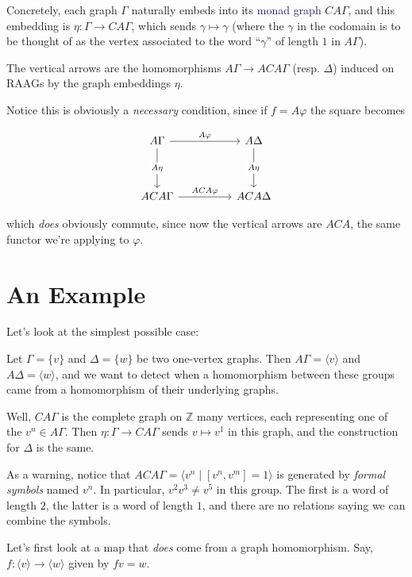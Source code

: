 \documentclass[12pt]{article}
\theoremstyle{definition}
\theoremstyle{theorem}
\newcommand*{\important}[1]{\textcolor{MidnightBlue}{#1}}
\begin{document}
Concretely, each graph $\Gamma$ naturally embeds into its 
\important{monad graph} $CA\Gamma$, and this embedding is 
$\eta : \Gamma \to CA\Gamma$, which sends $\gamma \mapsto \gamma$ 
(where the $\gamma$ in the codomain is to be thought of as the vertex 
associated to the word ``$\gamma$'' of length $1$ in $A\Gamma$).

The vertical arrows are the homomorphisms $A\Gamma \to ACA\Gamma$ (resp. $\Delta$) 
induced on RAAGs by the graph embeddings $\eta$.

Notice this is obviously a \emph{necessary} condition, since if $f = A\varphi$
the square becomes

\[\begin{tikzcd}
	A\Gamma && A\Delta \\
	\\
	ACA\Gamma && ACA\Delta
	\arrow["A\varphi", from=1-1, to=1-3]
	\arrow["ACA\varphi", from=3-1, to=3-3]
	\arrow["{A \eta}"{description}, from=1-1, to=3-1]
	\arrow["A\eta"{description}, from=1-3, to=3-3]
\end{tikzcd}\]

which \emph{does} obviously commute, since now the vertical arrows are 
$ACA$, the same functor we're applying to $\varphi$.


\section{An Example}

Let's look at the simplest possible case:

Let $\Gamma = \{ v \}$ and $\Delta = \{ w \}$ be two one-vertex graphs.
Then $A \Gamma = \langle v \rangle$ and $A \Delta = \langle w \rangle$,
and we want to detect when a homomorphism between these groups came from a
homomorphism of their underlying graphs.

Well, $CA \Gamma$ is the complete graph on $\mathbb{Z}$ many vertices, each
representing one of the $v^n \in A \Gamma$. 
Then $\eta : \Gamma \to CA \Gamma$ sends $v \mapsto v^1$ in this graph,
and the construction for $\Delta$ is the same.

As a warning, notice that $ACA\Gamma = \langle v^n \mid [v^n, v^m] = 1 \rangle$
is generated by \emph{formal symbols} named $v^n$. In particular,
$v^2 v^3 \neq v^5$ in this group. The first is a word of length $2$, the latter
is a word of length $1$, and there are no relations saying we can combine
the symbols.

\bigskip

Let's first look at a map that \emph{does} come from a graph homomorphism.
Say, $f : \langle v \rangle \to \langle w \rangle$ given by $fv = w$.
\end{document}
